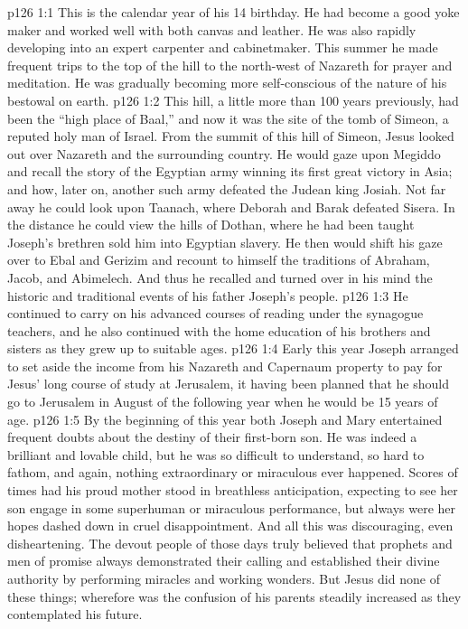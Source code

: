 \vs p126 1:1 This is the calendar year of his 14 birthday. He had become a good yoke maker and worked well with both canvas and leather. He was also rapidly developing into an expert carpenter and cabinetmaker. This summer he made frequent trips to the top of the hill to the north\hyp{}west of Nazareth for prayer and meditation. He was gradually becoming more self\hyp{}conscious of the nature of his bestowal on earth.
\vs p126 1:2 This hill, a little more than 100 years previously, had been the “high place of Baal,” and now it was the site of the tomb of Simeon, a reputed holy man of Israel. From the summit of this hill of Simeon, Jesus looked out over Nazareth and the surrounding country. He would gaze upon Megiddo and recall the story of the Egyptian army winning its first great victory in Asia; and how, later on, another such army defeated the Judean king Josiah. Not far away he could look upon Taanach, where Deborah and Barak defeated Sisera. In the distance he could view the hills of Dothan, where he had been taught Joseph’s brethren sold him into Egyptian slavery. He then would shift his gaze over to Ebal and Gerizim and recount to himself the traditions of Abraham, Jacob, and Abimelech. And thus he recalled and turned over in his mind the historic and traditional events of his father Joseph’s people.
\vs p126 1:3 He continued to carry on his advanced courses of reading under the synagogue teachers, and he also continued with the home education of his brothers and sisters as they grew up to suitable ages.
\vs p126 1:4 Early this year Joseph arranged to set aside the income from his Nazareth and Capernaum property to pay for Jesus’ long course of study at Jerusalem, it having been planned that he should go to Jerusalem in August of the following year when he would be 15 years of age.
\vs p126 1:5 By the beginning of this year both Joseph and Mary entertained frequent doubts about the destiny of their first\hyp{}born son. He was indeed a brilliant and lovable child, but he was so difficult to understand, so hard to fathom, and again, nothing extraordinary or miraculous ever happened. Scores of times had his proud mother stood in breathless anticipation, expecting to see her son engage in some superhuman or miraculous performance, but always were her hopes dashed down in cruel disappointment. And all this was discouraging, even disheartening. The devout people of those days truly believed that prophets and men of promise always demonstrated their calling and established their divine authority by performing miracles and working wonders. But Jesus did none of these things; wherefore was the confusion of his parents steadily increased as they contemplated his future.
